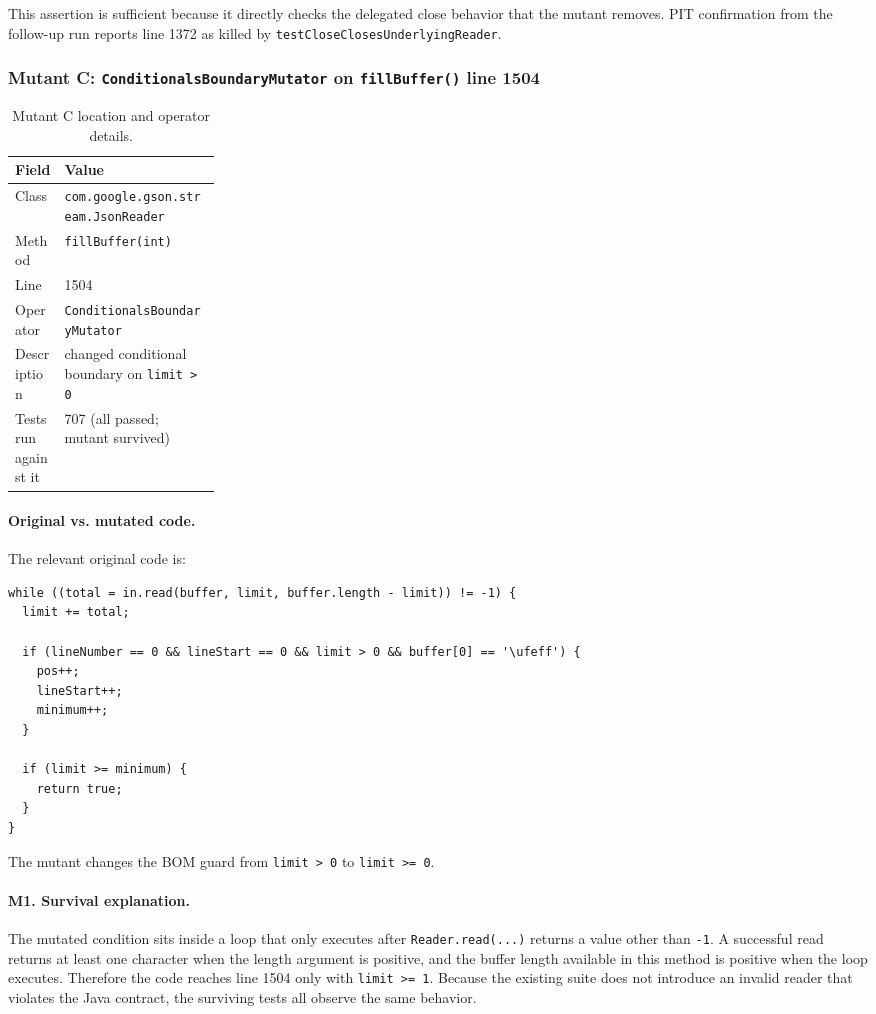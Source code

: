 \documentclass[11pt]{article}
\begin{document}
This assertion is sufficient because it directly checks the delegated close behavior that the mutant removes. PIT confirmation from the follow-up run reports line 1372 as killed by \texttt{testCloseClosesUnderlyingReader}.

\subsubsection{Mutant C: \texttt{ConditionalsBoundaryMutator} on \texttt{fillBuffer()} line 1504}
\begin{table}[H]
\centering
\small
\begin{tabularx}{\linewidth}{>{\raggedright\arraybackslash}p{0.24\linewidth}X}
\toprule
Field & Value \\
\midrule
Class & \texttt{com.google.gson.stream.JsonReader} \\
Method & \texttt{fillBuffer(int)} \\
Line & 1504 \\
Operator & \texttt{ConditionalsBoundaryMutator} \\
Description & changed conditional boundary on \texttt{limit > 0} \\
Tests run against it & 707 (all passed; mutant survived) \\
\bottomrule
\end{tabularx}
\caption{Mutant C location and operator details.}
\end{table}

\paragraph{Original vs. mutated code.}
The relevant original code is:
\begin{lstlisting}[basicstyle=\ttfamily\small,breaklines=true]
while ((total = in.read(buffer, limit, buffer.length - limit)) != -1) {
  limit += total;

  if (lineNumber == 0 && lineStart == 0 && limit > 0 && buffer[0] == '\ufeff') {
    pos++;
    lineStart++;
    minimum++;
  }

  if (limit >= minimum) {
    return true;
  }
}
\end{lstlisting}

The mutant changes the BOM guard from \texttt{limit > 0} to \texttt{limit >= 0}.

\paragraph{M1. Survival explanation.}
The mutated condition sits inside a loop that only executes after \texttt{Reader.read(...)} returns a value other than \texttt{-1}. A successful read returns at least one character when the length argument is positive, and the buffer length available in this method is positive when the loop executes. Therefore the code reaches line 1504 only with \texttt{limit >= 1}. Because the existing suite does not introduce an invalid reader that violates the Java contract, the surviving tests all observe the same behavior.
\end{document}
